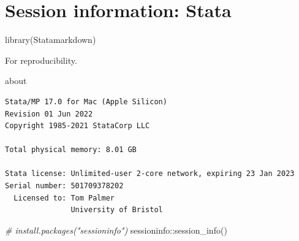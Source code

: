 \documentclass[
  10pt,
]{book}
\newenvironment{Shaded}{\begin{snugshade}}{\end{snugshade}}
\newcommand{\CommentTok}[1]{\textcolor[rgb]{0.56,0.35,0.01}{\textit{#1}}}
\newcommand{\FunctionTok}[1]{\textcolor[rgb]{0.00,0.00,0.00}{#1}}
\newcommand{\NormalTok}[1]{#1}
\newcommand{\SpecialCharTok}[1]{\textcolor[rgb]{0.00,0.00,0.00}{#1}}
\begin{document}
\hypertarget{session-information-stata}{%
\chapter*{Session information: Stata}\label{session-information-stata}}

\begin{Shaded}
\begin{Highlighting}[]
\FunctionTok{library}\NormalTok{(Statamarkdown)}
\end{Highlighting}
\end{Shaded}

For reproducibility.

\begin{Shaded}
\begin{Highlighting}[]
\NormalTok{about}
\end{Highlighting}
\end{Shaded}

\begin{verbatim}
Stata/MP 17.0 for Mac (Apple Silicon)
Revision 01 Jun 2022
Copyright 1985-2021 StataCorp LLC

Total physical memory: 8.01 GB

Stata license: Unlimited-user 2-core network, expiring 23 Jan 2023
Serial number: 501709378202
  Licensed to: Tom Palmer
               University of Bristol
\end{verbatim}

\begin{Shaded}
\begin{Highlighting}[]
\CommentTok{\# install.packages("sessioninfo")}
\NormalTok{sessioninfo}\SpecialCharTok{::}\FunctionTok{session\_info}\NormalTok{()}
\end{Highlighting}
\end{Shaded}
\end{document}
